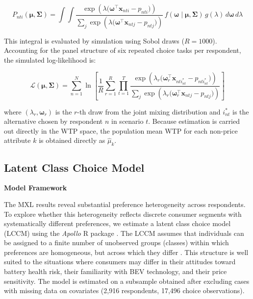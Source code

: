 \documentclass[a4paper,fleqn]{cas-sc}   %
\begin{document}
\begin{equation}
    P_{nti}(\boldsymbol{\mu}, \boldsymbol{\Sigma}) = \int\!\int \frac{\exp\!\left(\lambda\bigl(\boldsymbol{\omega}^{\top}\mathbf{x}_{nti} - p_{nti}\bigr)\right)}{\displaystyle\sum_{j} \exp\!\left(\lambda\bigl(\boldsymbol{\omega}^{\top}\mathbf{x}_{ntj} - p_{ntj}\bigr)\right)} \, f(\boldsymbol{\omega} \mid \boldsymbol{\mu}, \boldsymbol{\Sigma})\, g(\lambda) \, d\boldsymbol{\omega}\, d\lambda
    \label{eq:mxl_prob}
\end{equation}

\noindent This integral is evaluated by simulation using Sobol draws ($R = 1000$). Accounting for the panel structure of six repeated choice tasks per respondent, the simulated log-likelihood is:

\begin{equation}
    \mathcal{L}(\boldsymbol{\mu}, \boldsymbol{\Sigma}) = \sum_{n=1}^{N} \ln \left[ \frac{1}{R} \sum_{r=1}^{R} \prod_{t=1}^{T} \frac{\exp\!\left(\lambda_r\bigl(\boldsymbol{\omega}_r^{\top}\mathbf{x}_{nti_{nt}^*} - p_{nti_{nt}^*}\bigr)\right)}{\displaystyle\sum_{j} \exp\!\left(\lambda_r\bigl(\boldsymbol{\omega}_r^{\top}\mathbf{x}_{ntj} - p_{ntj}\bigr)\right)} \right]
    \label{eq:mxl_ll}
\end{equation}

\noindent where $(\lambda_r, \boldsymbol{\omega}_r)$ is the $r$-th draw from the joint mixing distribution and $i_{nt}^*$ is the alternative chosen by respondent $n$ in scenario $t$. Because estimation is carried out directly in the WTP space, the population mean WTP for each non-price attribute $k$ is obtained directly as $\hat{\mu}_k$.



\subsection{Latent Class Choice Model}
\vspace{\baselineskip}
\noindent \textbf{Model Framework} \par

The MXL results reveal substantial preference heterogeneity across respondents. To explore whether this heterogeneity reflects discrete consumer segments with systematically different preferences, we estimate a latent class choice model (LCCM) using the \textit{Apollo} R package \parencite{hessApolloFlexiblePowerful2019}. The LCCM assumes that individuals can be assigned to a finite number of unobserved groups (classes) within which preferences are homogeneous, but across which they differ \parencite{kamakuraProbabilisticChoiceModel1989, greeneLatentClassModel2003}. This structure is well suited to the situations where consumers may differ in their attitudes toward battery health risk, their familiarity with BEV technology, and their price sensitivity. The model is estimated on a subsample obtained after excluding cases with missing data on covariates (2,916 respondents, 17,496 choice observations).
\end{document}
